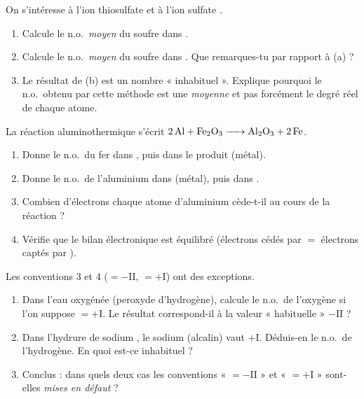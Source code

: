 \documentclass[11pt,a4paper]{article}
\begin{document}
\begin{exercice}
On s'intéresse à l'ion thiosulfate  et à l'ion sulfate .
\begin{enumerate}[label=\alph*),leftmargin=1.8em,topsep=2pt,itemsep=1.5pt]
  \item Calcule le n.o.\ \emph{moyen} du soufre dans .
  \item Calcule le n.o.\ \emph{moyen} du soufre dans . Que remarques-tu par rapport à (a) ?
  \item Le résultat de (b) est un nombre « inhabituel ». Explique pourquoi le n.o.\ obtenu par cette méthode
        est une \emph{moyenne} et pas forcément le degré réel de chaque atome.
\end{enumerate}
\end{exercice}

\begin{exercice}
La réaction aluminothermique s'écrit $\ce{2 Al + Fe2O3 -> Al2O3 + 2 Fe}$.
\begin{enumerate}[label=\alph*),leftmargin=1.8em,topsep=2pt,itemsep=1.5pt]
  \item Donne le n.o.\ du fer dans , puis dans le produit  (métal).
  \item Donne le n.o.\ de l'aluminium dans  (métal), puis dans .
  \item Combien d'électrons chaque atome d'aluminium cède-t-il au cours de la réaction ?
  \item Vérifie que le bilan électronique est équilibré (électrons cédés par  $=$ électrons captés par ).
\end{enumerate}
\end{exercice}

\begin{exercice}
Les conventions 3 et 4 ($=-\mathrm{II}$, $=+\mathrm{I}$) ont des exceptions.
\begin{enumerate}[label=\alph*),leftmargin=1.8em,topsep=2pt,itemsep=1.5pt]
  \item Dans l'eau oxygénée  (peroxyde d'hydrogène), calcule le n.o.\ de l'oxygène si l'on suppose
        $=+\mathrm{I}$. Le résultat correspond-il à la valeur « habituelle » $-\mathrm{II}$ ?
  \item Dans l'hydrure de sodium , le sodium (alcalin) vaut $+\mathrm{I}$. Déduis-en le n.o.\ de
        l'hydrogène. En quoi est-ce inhabituel ?
  \item Conclus : dans quels deux cas les conventions « $=-\mathrm{II}$ » et « $=+\mathrm{I}$ »
        sont-elles \emph{mises en défaut} ?
\end{enumerate}
\end{exercice}
\end{document}
